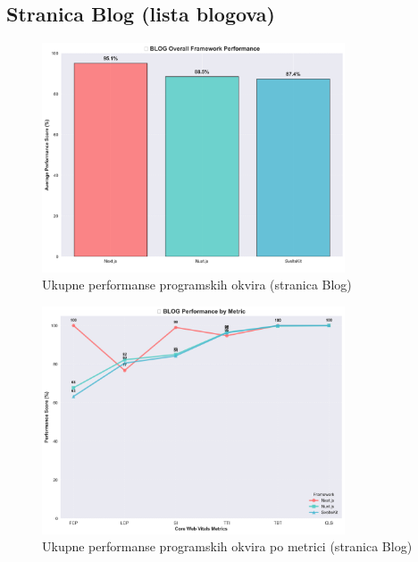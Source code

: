 
\subsection{Stranica Blog (lista blogova)}

\begin{figure}[H]
    \centering
    \includegraphics[width=0.8\textwidth]{slike/rezultati/blog/blog_framework_overall_performance.png}
    \caption{Ukupne performanse programskih okvira (stranica Blog)}
    \label{fig:testiranje-blog-ukupne-performanse}
\end{figure}

\begin{figure}[H]
    \centering
    \includegraphics[width=0.8\textwidth]{slike/rezultati/blog/blog_performance_by_metric.png}
    \caption{Ukupne performanse programskih okvira po metrici (stranica Blog)}
    \label{fig:testiranje-blog-performanse-po-metrici}
\end{figure}

